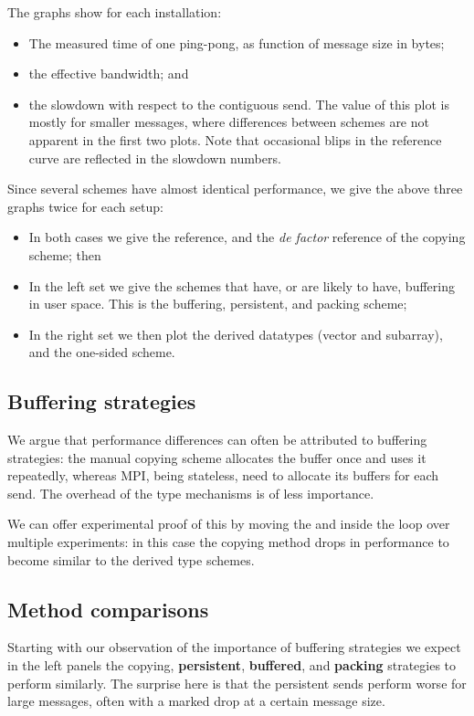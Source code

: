 The graphs show for each installation:
\begin{itemize}
\item The measured time of one ping-pong, as function of message size
  in bytes;
\item the effective bandwidth; and
\item the slowdown with respect to the contiguous send. The value of
  this plot is mostly for smaller messages, where differences between
  schemes are not apparent in the first two plots. Note that
  occasional
  blips in the reference curve are reflected in the slowdown numbers.
\end{itemize}
Since several schemes have almost identical performance, we
give the above three graphs twice for each setup:
\begin{itemize}
\item In both cases we give the reference, and the \emph{de factor} reference
  of the copying scheme; then
\item In the left set we give the schemes that have, or are likely to have,
  buffering in user space. This is the buffering, persistent, and packing scheme;
\item In the right set we then plot the derived datatypes (vector and subarray),
  and the one-sided scheme.
\end{itemize}

\subsection{Buffering strategies}

We argue that performance differences can often be attributed to buffering strategies:
the manual copying scheme allocates the buffer once and uses
it repeatedly, whereas MPI, being stateless, need to allocate its buffers for each send.
The overhead of the type mechanisms is of less importance.

We can offer experimental proof of this 
by moving the  and  inside the
loop over multiple experiments: in this case the copying
method drops in performance to become similar to the derived type
schemes.

\subsection{Method comparisons}

Starting with our observation of the importance of buffering strategies
we expect in the left panels the copying, \textbf{persistent}, \textbf{buffered},
and \textbf{packing} strategies
to perform similarly. The surprise here is that the persistent sends perform worse for large messages,
often with a marked drop at a certain message size.

